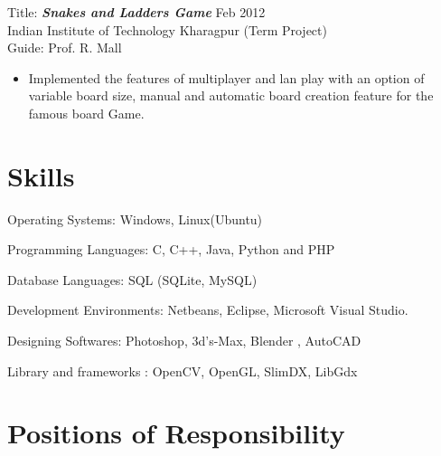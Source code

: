 \documentclass[hidelinks,margin,line,10pt,a4paper]{resume}
\begin{document}
\begin{resume}
Title: \textbf{\emph{Snakes and Ladders Game}} \hfill Feb 2012 \\
Indian Institute of Technology Kharagpur \hfill (Term Project)  \\
Guide: Prof. R. Mall
\vspace{2mm}%
\begin{itemize}
\item Implemented the features of multiplayer and lan play with an option of variable board size, manual and automatic board creation feature for the famous board Game.
\end{itemize}
\fi


    \section{\mysidestyle Skills} 

\begin{list2}
\item Operating Systems: Windows, Linux(Ubuntu)\vspace{1mm}%
\item Programming Languages: C, C++, Java, Python and PHP \vspace{1mm}%
\item Database Languages: SQL (SQLite, MySQL)\vspace{1mm}%
\item Development Environments: Netbeans, Eclipse, Microsoft Visual Studio.\vspace{1mm}%
\item Designing Softwares: Photoshop, 3d's-Max, Blender , AutoCAD\vspace{1mm}%
\item Library and frameworks : OpenCV, OpenGL, SlimDX, LibGdx\vspace{1mm}%
\end{list2}


    
\section{\mysidestyle Positions of Responsibility} 


\end{resume}
\end{document}
